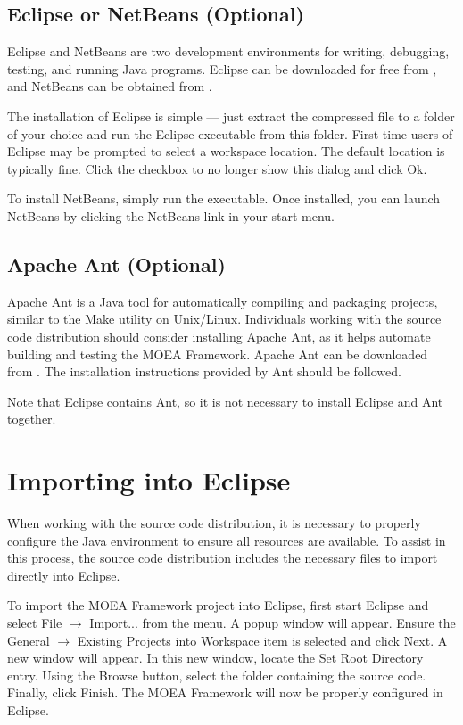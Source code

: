 \subsection{Eclipse or NetBeans (Optional)}
Eclipse and NetBeans are two development environments for writing, debugging, testing, and running Java programs.  Eclipse can be downloaded for free from , and NetBeans can be obtained from .

The installation of Eclipse is simple --- just extract the compressed file to a folder of your choice and run the Eclipse executable from this folder.  First-time users of Eclipse may be prompted to select a workspace location.  The default location is typically fine.  Click the checkbox to no longer show this dialog and click Ok.

To install NetBeans, simply run the executable.  Once installed, you can launch NetBeans by clicking the NetBeans link in your start menu.

\subsection{Apache Ant (Optional)}
Apache Ant is a Java tool for automatically compiling and packaging projects, similar to the Make utility on Unix/Linux.  Individuals working with the source code distribution should consider installing Apache Ant, as it helps automate building and testing the MOEA Framework.  Apache Ant can be downloaded from .  The installation instructions provided by Ant should be followed.

Note that Eclipse contains Ant, so it is not necessary to install Eclipse and Ant together.

\section{Importing into Eclipse}
When working with the source code distribution, it is necessary to properly configure the Java environment to ensure all resources are available.  To assist in this process, the source code distribution includes the necessary files to import directly into Eclipse.

To import the MOEA Framework project into Eclipse, first start Eclipse and select File $\rightarrow$ Import... from the menu.  A popup window will appear.  Ensure the General $\rightarrow$ Existing Projects into Workspace item is selected and click Next.  A new window will appear.  In this new window, locate the Set Root Directory entry.  Using the Browse button, select the \folder{\moeaframework} folder containing the source code.  Finally, click Finish.  The MOEA Framework will now be properly configured in Eclipse.

